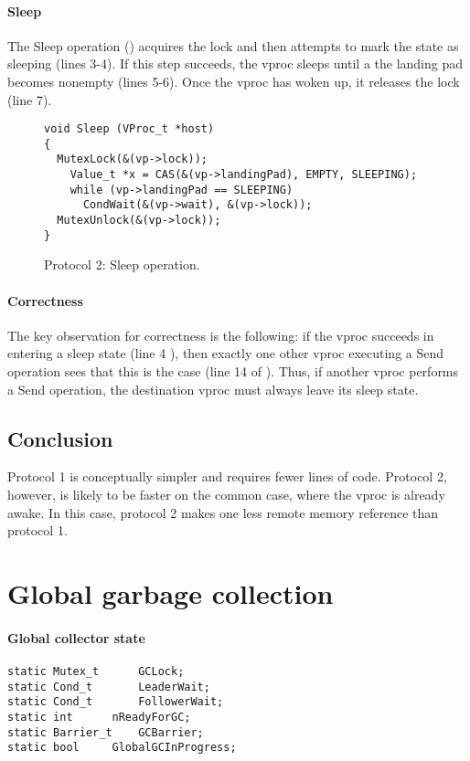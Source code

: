 \documentclass[11pt]{article}
\begin{document}
\paragraph{Sleep}
The Sleep operation () acquires the lock
and then attempts to mark the state as sleeping (lines 3-4).
If this step succeeds, the vproc sleeps until a the landing pad becomes
nonempty (lines 5-6).
Once the vproc has woken up, it releases the lock (line 7).

\begin{figure}
\lstset{language=C}
\lstset{commentstyle=\textit}
\lstset{numbers=left}
\begin{lstlisting}
void Sleep (VProc_t *host)
{
  MutexLock(&(vp->lock));
    Value_t *x = CAS(&(vp->landingPad), EMPTY, SLEEPING);
    while (vp->landingPad == SLEEPING)
      CondWait(&(vp->wait), &(vp->lock));
  MutexUnlock(&(vp->lock));
}
\end{lstlisting}
\caption{Protocol 2: Sleep operation.}\label{fig:protocol2-sleep}
\end{figure}

\paragraph{Correctness}
The key observation for correctness is the following: if the vproc succeeds in 
entering a sleep state (line 4 ), then exactly one other vproc executing a Send operation sees 
that this is the case (line 14 of ).
Thus, if another vproc performs a Send operation, the destination vproc must always
leave its sleep state.

\subsection{Conclusion}\label{sec:conclusion}
Protocol 1 is conceptually simpler and requires fewer lines of code.
Protocol 2, however, is likely to be faster on the common case, where the vproc is
already awake.
In this case, protocol 2 makes one less remote memory reference than protocol 1.

\section{Global garbage collection}\label{sec:global-gc}

\paragraph{Global collector state}
\lstset{language=C}
\lstset{commentstyle=\textit}
\begin{lstlisting}
static Mutex_t		GCLock;
static Cond_t		LeaderWait;
static Cond_t		FollowerWait;
static int		nReadyForGC;
static Barrier_t	GCBarrier;
static bool		GlobalGCInProgress;
\end{lstlisting}
\end{document}
